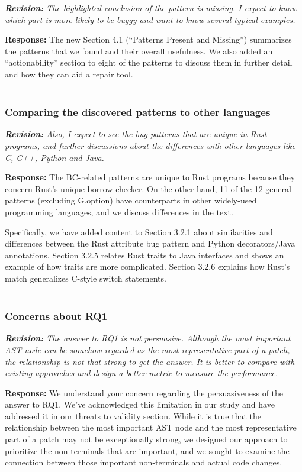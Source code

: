 \documentclass{article}
\begin{document}
\textit{\textbf{Revision:} The highlighted conclusion of the pattern is missing. I expect to know which part is more likely to be buggy and want to know several typical examples.}

\textbf{Response:} The new Section 4.1 (``Patterns Present and Missing'') summarizes the patterns that we found and their overall usefulness. We also added an “actionability” section to eight of the patterns to discuss them in further detail and how they can aid a repair tool. \\ \\

\subsubsection{\label{rev:1:compare}Comparing the discovered patterns to other languages}

\textit{\textbf{Revision:} Also, I expect to see the bug patterns that are unique in Rust programs, and further discussions about the differences with other languages like C, C++, Python and Java. }

\textbf{Response:} The BC-related patterns are unique to Rust programs because they concern Rust's unique borrow checker. On the other hand, 11 of the 12 general patterns (excluding G.option) have counterparts in other widely-used programming languages, and we discuss differences in the text.

Specifically, we have added content to Section 3.2.1 about similarities and differences between the Rust attribute bug pattern and Python decorators/Java annotations. Section 3.2.5 relates Rust traits to Java interfaces and shows an example of how traits are more complicated. Section 3.2.6 explains how Rust's match generalizes C-style switch statements. \\ \\

\subsubsection{\label{rev:1:rq1}Concerns about RQ1}

\textit{\textbf{Revision:} The answer to RQ1 is not persuasive. Although the most important AST node can be somehow regarded as the most representative part of a patch, the relationship is not that strong to get the answer. It is better to compare with existing approaches and design a better metric to measure the performance.}

\textbf{Response:} We understand your concern regarding the persuasiveness of the answer to RQ1. We've acknowledged this limitation in our study and have addressed it in our threats to validity section. While it is true that the relationship between the most important AST node and the most representative part of a patch may not be exceptionally strong, we designed our approach to prioritize the non-terminals that are important, and we sought to examine the connection between those important non-terminals and actual code changes.
\end{document}
